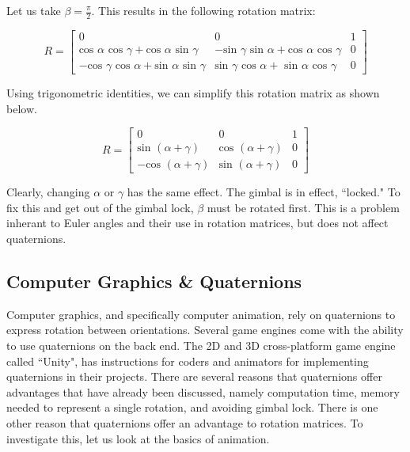 Let us take $\beta= \frac{\pi}{2}$.
This results in the following rotation matrix:

$$
R =
\begin{bmatrix}
0 & 0 & 1 \\
\text{cos }\alpha  \text{ cos }\gamma + \text{cos }\alpha \text{ sin }\gamma 	& - \text{sin }\gamma \text{ sin }\alpha + \text{cos }\alpha \text{ cos }\gamma& 0 \\
 -\text{cos }\gamma \text{ cos }\alpha + \text{sin }\alpha \text{ sin }\gamma 		& \text{sin }\gamma \text{ cos } \alpha + \text{ sin }\alpha \text{ cos } \gamma  & 0
\end{bmatrix}
$$

Using trigonometric identities, we can simplify this rotation matrix as shown below.

$$
R =
\begin{bmatrix}
0 & 0 & 1 \\
\text{sin }(\alpha + \gamma) 	& \text{cos }(\alpha + \gamma) & 0 \\
-\text{cos }(\alpha + \gamma) 	& \text{sin }(\alpha + \gamma)   & 0
\end{bmatrix}
$$

Clearly, changing $\alpha$ or $\gamma$ has the same effect.
The gimbal is in effect, ``locked."
To fix this and get out of the gimbal lock, $\beta$ must be rotated first.
This is a problem inherant to Euler angles and their use in rotation matrices, but does not affect quaternions.

\subsection{Computer Graphics \& Quaternions}

Computer graphics, and specifically computer animation, rely on quaternions to express rotation between orientations.
Several game engines come with the ability to use quaternions on the back end.
The 2D and 3D cross-platform game engine called ``Unity", has instructions for coders and animators for implementing quaternions in their projects.
There are several reasons that quaternions offer advantages that have already been discussed, namely computation time, memory needed to represent a single rotation, and avoiding gimbal lock.
There is one other reason that quaternions offer an advantage to rotation matrices.
To investigate this, let us look at the basics of animation.
